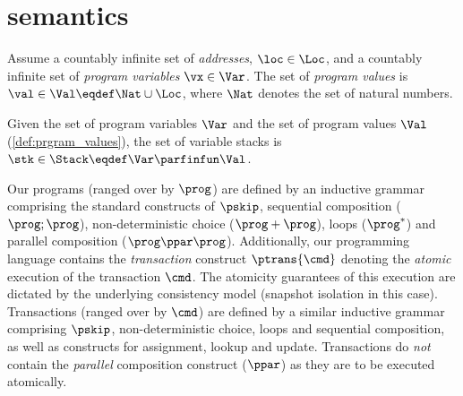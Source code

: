 \section{semantics\label{sec:semantics}}
\begin{definition}\label{def:prgram_values}
Assume a countably infinite set of \emph{addresses}, $\loc \in \Loc$, and a countably infinite set of \emph{program variables} $\vx \in {\Var}$. The set of \emph{program values} is $\val \in \Val \eqdef \Nat \cup \Loc$, where $\Nat$ denotes the set of natural numbers.
\end{definition}
%
%
\begin{definition}[Stacks]\label{def:stacks}
Given the set of program variables $\Var$ and the set of program values $\Val$ (\ref{def:prgram_values}), the set of variable stacks is $\stk \in \Stack \eqdef \Var \parfinfun \Val$.
\end{definition}
%
%
Our programs (ranged over by $\prog$) are defined by an inductive grammar comprising the standard constructs of $\pskip$, sequential composition ($\prog; \prog$), non-deterministic choice ($\prog+\prog$), loops ($\prog^*$) and parallel composition ($\prog \ppar \prog$). Additionally, our programming language contains the \emph{transaction} construct $\ptrans{\cmd}$ denoting the \emph{atomic} execution of the transaction $\cmd$. The atomicity guarantees of this execution are dictated by the underlying consistency model (snapshot isolation in this case).
Transactions (ranged over by $\cmd$) are defined by a similar inductive grammar comprising $\pskip$, non-deterministic choice, loops and sequential composition, as well as constructs for assignment, lookup and update. Transactions do \emph{not} contain the \emph{parallel} composition construct ($\ppar$) as they are to be executed atomically.

